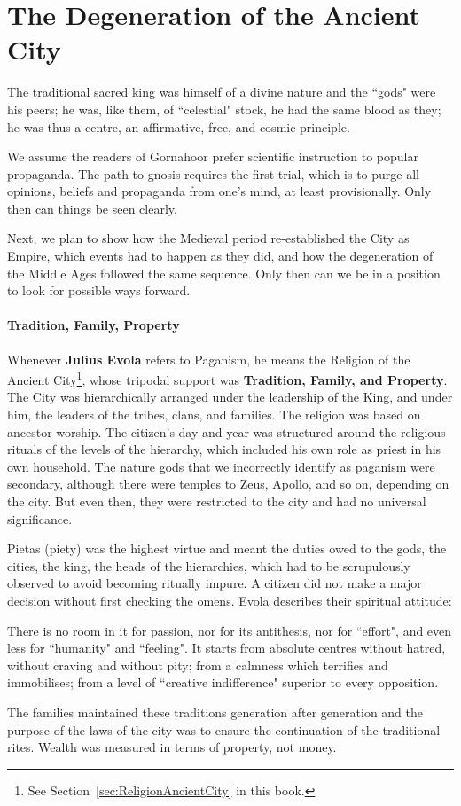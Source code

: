 \section{The Degeneration of the Ancient City}

The traditional sacred king was himself of a divine nature and the ``gods" were his peers; he was, like them, of ``celestial" stock, he had the same blood as they; he was thus a centre, an affirmative, free, and cosmic principle. 

We assume the readers of Gornahoor prefer scientific instruction to popular propaganda. The path to gnosis requires the first trial, which is to purge all opinions, beliefs and propaganda from one's mind, at least provisionally. Only then can things be seen clearly.

Next, we plan to show how the Medieval period re-established the City as Empire, which events had to happen as they did, and how the degeneration of the Middle Ages followed the same sequence. Only then can we be in a position to look for possible ways forward.

\paragraph{Tradition, Family, Property}
Whenever \textbf{Julius Evola} refers to Paganism, he means the Religion of the Ancient City\footnote{See Section~\ref{sec:ReligionAncientCity} in this book.}, whose tripodal support was \textbf{Tradition, Family, and Property}. The City was hierarchically arranged under the leadership of the King, and under him, the leaders of the tribes, clans, and families. The religion was based on ancestor worship. The citizen's day and year was structured around the religious rituals of the levels of the hierarchy, which included his own role as priest in his own household. The nature gods that we incorrectly identify as paganism were secondary, although there were temples to Zeus, Apollo, and so on, depending on the city. But even then, they were restricted to the city and had no universal significance.

Pietas (piety) was the highest virtue and meant the duties owed to the gods, the cities, the king, the heads of the hierarchies, which had to be scrupulously observed to avoid becoming ritually impure. A citizen did not make a major decision without first checking the omens. Evola describes their spiritual attitude:

\begin{quotex}
There is no room in it for passion, nor for its antithesis, nor for ``effort", and even less for ``humanity" and ``feeling". It starts from absolute centres without hatred, without craving and without pity; from a calmness which terrifies and immobilises; from a level of ``creative indifference" superior to every opposition.

\end{quotex}
The families maintained these traditions generation after generation and the purpose of the laws of the city was to ensure the continuation of the traditional rites. Wealth was measured in terms of property, not money.

